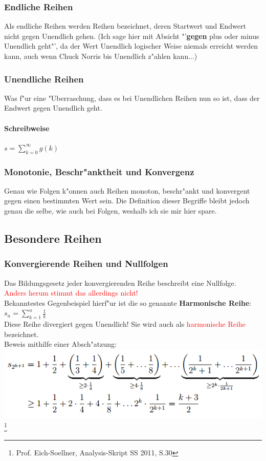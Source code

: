 \subsubsection{Endliche Reihen}
Als endliche Reihen werden Reihen bezeichnet, deren Startwert und Endwert nicht gegen Unendlich gehen. (Ich sage hier mit Absicht "'\textbf{gegen} plus oder minus Unendlich geht"', da der Wert Unendlich logischer Weise niemals erreicht werden kann, auch wenn Chuck Norris bis Unendlich z"ahlen kann...)

\subsubsection{Unendliche Reihen}
Was f"ur eine "Uberraschung, dass es bei Unendlichen Reihen nun so ist, dass der Endwert gegen Unendlich geht.

\paragraph{Schreibweise}
$s = \sum\limits_{k=0}^{\infty}g(k)$\\

\subsubsection{Monotonie, Beschr"anktheit und Konvergenz}
Genau wie Folgen k"onnen auch Reihen monoton, beschr"ankt und konvergent gegen einen bestimmten Wert sein. Die Definition dieser Begriffe bleibt jedoch genau die selbe, wie auch bei Folgen, weshalb ich sie mir hier spare.

\subsection{Besondere Reihen}
\subsubsection{Konvergierende Reihen und Nullfolgen}
Das Bildungsgesetz jeder konvergierenden Reihe beschreibt eine Nullfolge.\\
\textcolor{red}{Anders herum stimmt das allerdings nicht!}\\
Bekanntestes Gegenbeispiel hierf"ur ist die so genannte \textbf{Harmonische Reihe}:\\
$s_n = \sum\limits_{k=1}^{n}\frac{1}{k}$\\
Diese Reihe divergiert gegen Unendlich! Sie wird auch als \textcolor{red}{harmonische Reihe} bezeichnet.\\
Beweis mithilfe einer Absch"atzung:\\
\includegraphics[width = 10 cm]{pictures/AbschaetzungHarmReihe}\footnote{Prof. Eich-Soellner, Analysis-Skript SS 2011, S.30}

